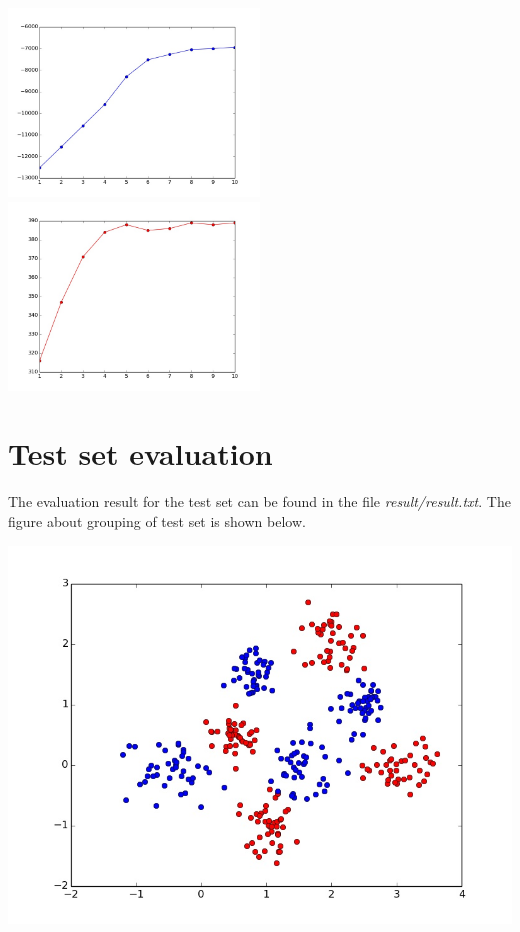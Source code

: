 \documentclass{article}
\begin{document}
\includegraphics[width=0.5\textwidth]{../result/likelihood.jpg}
\includegraphics[width=0.5\textwidth]{../result/predict.jpg}

\section{Test set evaluation}
The evaluation result for the test set can be found in the file  \emph{result/result.txt}. The figure about grouping of test set is shown below.

\includegraphics[width=\textwidth]{../result/test.jpg}
\end{document}
